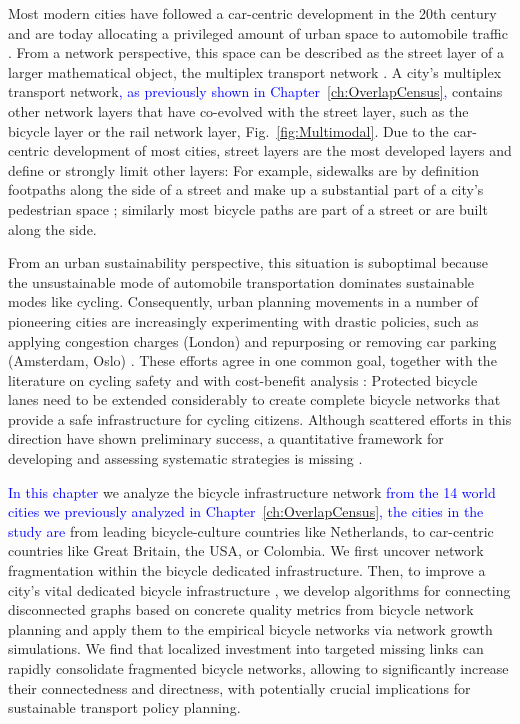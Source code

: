 Most modern cities have followed a car-centric development in the 20th century \cite{Jacobs1961Death} and are today allocating a privileged amount of urban space to automobile traffic \cite{Gossling2016Space,Szell2018Crowdsourced}. From a network perspective, this space can be described as the street layer of a larger mathematical object, the multiplex transport network \cite{morris2012transport,strano2015features,Aleta2017Multilayer}. A city's multiplex transport network\textcolor{blue}{, as previously shown in Chapter~\ref{ch:OverlapCensus},} contains other network layers that have co-evolved with the street layer, such as the bicycle layer or the rail network layer, Fig.~\ref{fig:Multimodal}. Due to the car-centric development of most cities, street layers are the most developed layers and define or strongly limit other layers: For example, sidewalks are by definition footpaths along the side of a street and make up a substantial part of a city's pedestrian space \cite{Gossling2016Space}; similarly most bicycle paths are part of a street or are built along the side.

From an urban sustainability perspective, this situation is suboptimal because the unsustainable mode of automobile transportation dominates sustainable modes like cycling. Consequently, urban planning movements in a number of pioneering cities are increasingly experimenting with drastic policies, such as applying congestion charges (London) \cite{Eliasson2008Lessons} and repurposing or removing car parking (Amsterdam, Oslo) \cite{Littke2016parklets,bliss2019hcp,Nieuwenhuijsen2016Car}. These efforts agree in one common goal, together with the literature on cycling safety \cite{Reynolds2009impact,Teschke2012route,Pucher2016Safer,aldred2018cycling} and with cost-benefit analysis \cite{gossling2019social}: Protected bicycle lanes need to be extended considerably to create complete bicycle networks that provide a safe infrastructure for cycling citizens. Although scattered efforts in this direction have shown preliminary success, a quantitative framework for developing and assessing systematic strategies is missing \cite{Gossling2020Cities}.

\textcolor{blue}{In this chapter} we analyze the bicycle infrastructure network \textcolor{blue}{from the 14 world cities we previously analyzed in Chapter~\ref{ch:OverlapCensus}, the cities in the study are} from leading bicycle-culture countries like Netherlands, to car-centric countries like Great Britain, the USA, or Colombia. We first uncover network fragmentation within the bicycle dedicated infrastructure. Then, to improve a city's vital dedicated bicycle infrastructure \cite{Dill2013Bicycle,Schoner2014Missing,Hull2014Infrastructure,Buehler2016Bikable}, we develop algorithms for connecting disconnected graphs based on concrete quality metrics from bicycle network planning \cite{Twaddell2018Multimodal} and apply them to the empirical bicycle networks via network growth simulations. We find that localized investment into targeted missing links can rapidly consolidate fragmented bicycle networks, allowing to significantly increase their connectedness and directness, with potentially crucial implications for sustainable transport policy planning.

